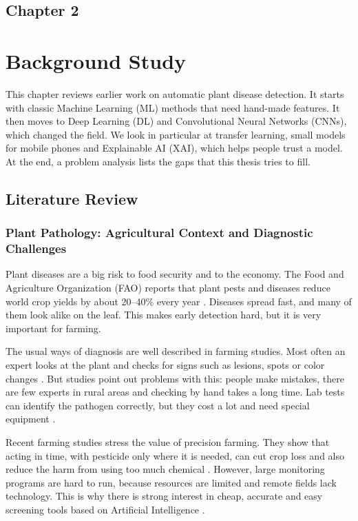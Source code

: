 \begin{center}
    \section*{\fontsize{20}{20}\selectfont Chapter 2}
\end{center}
\vspace{10mm}
\section{Background Study}

This chapter reviews earlier work on automatic plant disease detection. It starts with classic Machine Learning (ML) methods that need hand-made features. It then moves to Deep Learning (DL) and Convolutional Neural Networks (CNNs), which changed the field. We look in particular at transfer learning, small models for mobile phones and Explainable AI (XAI), which helps people trust a model. At the end, a problem analysis lists the gaps that this thesis tries to fill.

\subsection{Literature Review}

\subsubsection{Plant Pathology: Agricultural Context and Diagnostic Challenges}
Plant diseases are a big risk to food security and to the economy. The Food and Agriculture Organization (FAO) reports that plant pests and diseases reduce world crop yields by about 20--40\% every year \cite{strange2005plant}. Diseases spread fast, and many of them look alike on the leaf. This makes early detection hard, but it is very important for farming.

The usual ways of diagnosis are well described in farming studies. Most often an expert looks at the plant and checks for signs such as lesions, spots or color changes \cite{barbedo2018factors}. But studies point out problems with this: people make mistakes, there are few experts in rural areas and checking by hand takes a long time. Lab tests can identify the pathogen correctly, but they cost a lot and need special equipment \cite{fao2017future}.

Recent farming studies stress the value of precision farming. They show that acting in time, with pesticide only where it is needed, can cut crop loss and also reduce the harm from using too much chemical \cite{savary2019global}. However, large monitoring programs are hard to run, because resources are limited and remote fields lack technology. This is why there is strong interest in cheap, accurate and easy screening tools based on Artificial Intelligence \cite{lecun2015deep}.

